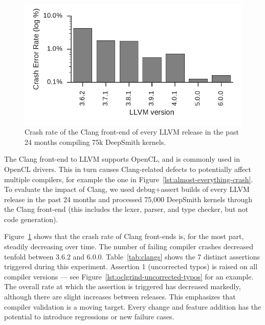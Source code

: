 \begin{figure}
  \centering %
  \includegraphics[width=.95\columnwidth]{build/img/clang-crashes}%
  \caption{%
    Crash rate of the Clang front-end of every LLVM release in the past 24 months compiling 75k DeepSmith kernels.
  }%
  \label{fig:clangs} %
\end{figure}

\begin{table}
  \scriptsize %
  \centering %
  
  \caption{%
    The number of DeepSmith programs which trigger distinct Clang front-end assertions, and the number of programs which trigger unreachables.%
  }
  \label{tab:clangs}
\end{table}

The Clang front-end to LLVM supports OpenCL, and is commonly used in OpenCL drivers. This in turn causes Clang-related defects to potentially affect multiple compilers, for example the one in Figure~\ref{lst:almost-everything-crash}. To evaluate the impact of Clang, we used debug+assert builds of every LLVM release in the past 24 months and processed 75,000 DeepSmith kernels through the Clang front-end (this includes the lexer, parser, and type checker, but not code generation).

Figure~\ref{fig:clangs} shows that the crash rate of Clang front-ends is, for the most part, steadily decreasing over time. The number of failing compiler crashes decreased tenfold between 3.6.2 and 6.0.0.
Table~\ref{tab:clangs} shows the 7 distinct assertions triggered during this experiment. Assertion 1 (uncorrected typos) is raised on all compiler versions --- see Figure~\ref{lst:oclgrind-uncorrected-typos} for an example. The overall rate at which the assertion is triggered has decreased markedly, although there are slight increases between releases. This emphasizes that compiler validation is a moving target. Every change and feature addition has the potential to introduce regressions or new failure cases.


